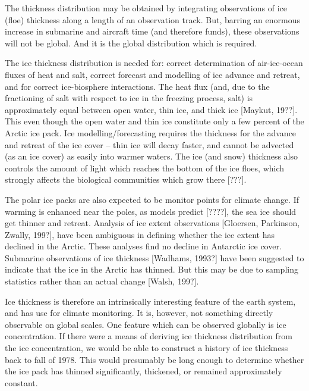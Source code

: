     The thickness distribution may be obtained by integrating observations 
of ice (floe) thickness along a length of an observation track.  But, barring
an enormous increase in submarine and aircraft time (and therefore funds), 
these observations will not be global.  And it is the global distribution 
which is required.

    The ice thickness distribution is needed for: correct determination of
air-ice-ocean fluxes of heat and salt, correct forecast and modelling
of ice advance and retreat, and for correct ice-biosphere interactions.  
The heat flux (and, due to the fractioning of salt with respect to ice in
the freezing process, salt) is approximately equal between open water, thin
ice, and thick ice [Maykut, 19??].  This even though the open water and thin
ice constitute only a few percent of the Arctic ice pack.  Ice 
modelling/forecasting requires the thickness for the advance and retreat 
of the ice cover -- thin ice will decay faster, and cannot be advected (as
an ice cover) as easily into warmer waters.  The ice (and snow) thickness
also controls the amount of light which reaches the bottom of the ice floes,
which strongly affects the biological communities which grow there [???].

    The polar ice packs are also expected to be monitor points for climate
change.  If warming is enhanced near the poles, as models predict [????],
the sea ice should get thinner and retreat.  Analysis of ice extent 
observations [Gloersen, Parkinson, Zwally, 199?], have been ambiguous in
defining whether the ice extent has declined in the Arctic.  These analyses
find no decline in Antarctic ice cover.  Submarine observations of ice
thickness [Wadhams, 1993?] have been suggested to indicate that the ice
in the Arctic has thinned.  But this may be due to sampling statistics
rather than an actual change [Walsh, 199?].

    Ice thickness is therefore an intrinsically interesting feature of
the earth system, and has use for climate monitoring.  It is, however,
not something directly observable on global scales.  One feature which
can be observed globally is ice concentration.  If there were a means
of deriving ice thickness distribution from the ice concentration, we
would be able to construct a history of ice thickness back to fall of
1978.  This would presumably be long enough to determine whether the
ice pack has thinned significantly, thickened, or remained approximately
constant.

